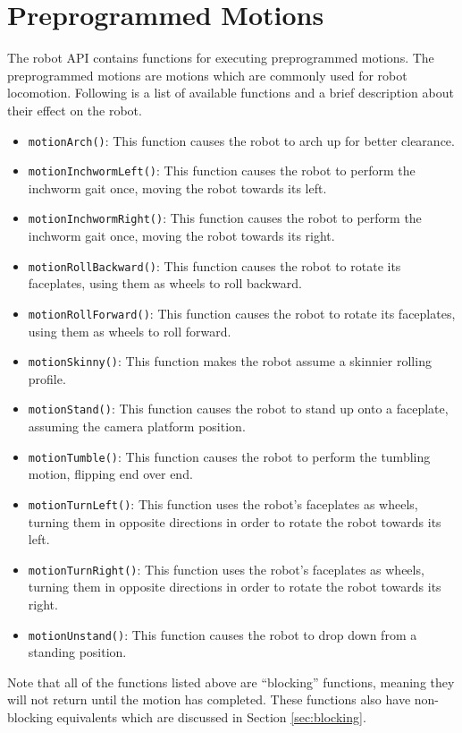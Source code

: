 \documentclass{article}
\begin{document}
\section{\label{sec:preprogrammed_motions}Preprogrammed Motions}
The robot API contains functions for executing preprogrammed motions. The 
preprogrammed motions are motions which are commonly used for robot locomotion.
Following is a list of available functions and a brief description about
their effect on the robot.
\begin{itemize}
\item \texttt{motionArch()}: This function causes the robot to arch up for better 
clearance.
\item \texttt{motionInchwormLeft()}: This function causes the robot to perform
  the inchworm gait once, moving the robot towards its left.
\item \texttt{motionInchwormRight()}: This function causes the robot to perform
  the inchworm gait once, moving the robot towards its right.
\item \texttt{motionRollBackward()}: This function causes the robot to rotate
  its faceplates, using them as wheels to roll backward.
\item \texttt{motionRollForward()}: This function causes the robot to rotate
  its faceplates, using them as wheels to roll forward.
\item \texttt{motionSkinny()}: This function makes the robot assume a skinnier
rolling profile.
\item \texttt{motionStand()}: This function causes the robot to stand up onto a 
  faceplate, assuming the camera platform position.
\item \texttt{motionTumble()}: This function causes the robot to perform the
tumbling motion, flipping end over end.
\item \texttt{motionTurnLeft()}: This function uses the robot's faceplates as wheels, turning
  them in opposite directions in order to rotate the robot towards its left.
\item \texttt{motionTurnRight()}: This function uses the robot's faceplates as wheels, turning
  them in opposite directions in order to rotate the robot towards its right.
\item \texttt{motionUnstand()}: This function causes the robot to drop down from a standing position.
\end{itemize}

Note that all of the functions listed above are ``blocking'' functions, meaning
they will not return until the motion has completed. These functions also
have non-blocking equivalents which are discussed in Section
\ref{sec:blocking}.
\end{document}
